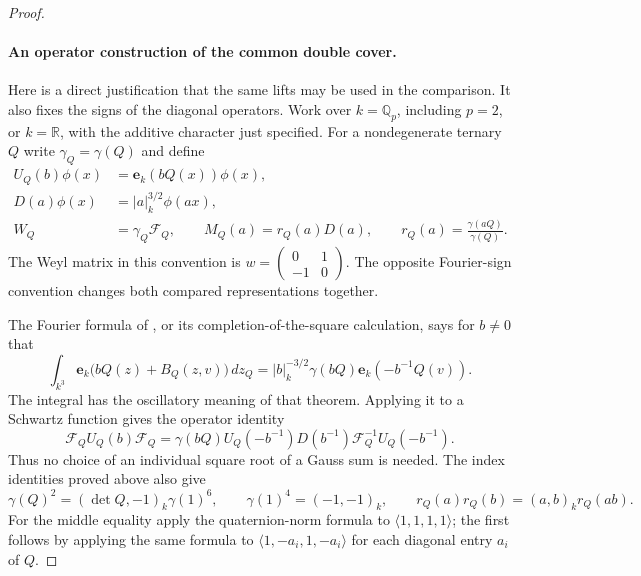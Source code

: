 \begin{proof}
\paragraph{An operator construction of the common double cover.}
Here is a direct justification that the same lifts may be used in
the comparison. It also fixes the signs of the diagonal operators.
Work over $k=\mathbb Q_p$, including $p=2$, or $k=\mathbb R$,
with the additive character just specified. For a nondegenerate
ternary $Q$ write $\gamma_Q=\gamma(Q)$ and define
\[
 \begin{split}
 U_Q(b)\phi(x)&=\mathbf e_k(bQ(x))\phi(x),\\
 D(a)\phi(x)&=|a|_k^{3/2}\phi(ax),\\
 W_Q&=\gamma_Q\mathcal F_Q,\qquad
 M_Q(a)=r_Q(a)D(a),\qquad
 r_Q(a)=\frac{\gamma(aQ)}{\gamma(Q)}.
 \end{split}
\]
The Weyl matrix in this convention is
$w=\left(\begin{smallmatrix}0&1\\-1&0\end{smallmatrix}\right)$.
The opposite Fourier-sign convention changes both compared
representations together.

The Fourier formula of \cite[I.14, Theorem~2]{weil}, or its
completion-of-the-square calculation, says for $b\ne0$ that
\[
 \int_{k^3}
 \mathbf e_k\bigl(bQ(z)+B_Q(z,v)\bigr)\,dz_Q
   =|b|_k^{-3/2}\gamma(bQ)\mathbf e_k(-b^{-1}Q(v)).
\]
The integral has the oscillatory meaning of that theorem.
Applying it to a Schwartz function gives the operator identity
\[
 \mathcal F_Q U_Q(b)\mathcal F_Q
 =\gamma(bQ)U_Q(-b^{-1})D(b^{-1})
                   \mathcal F_Q^{-1}U_Q(-b^{-1}).
\]
Thus no choice of an individual square root of a Gauss sum is
needed. The index identities proved above also give
\[
 \gamma(Q)^2=(\det Q,-1)_k\gamma(1)^6,
 \qquad \gamma(1)^4=(-1,-1)_k,
 \qquad r_Q(a)r_Q(b)=(a,b)_k r_Q(ab).
\]
For the middle equality apply the quaternion-norm formula to
$\langle1,1,1,1\rangle$; the first follows by applying the same
formula to $\langle1,-a_i,1,-a_i\rangle$ for each diagonal
entry $a_i$ of $Q$.


\end{proof}
